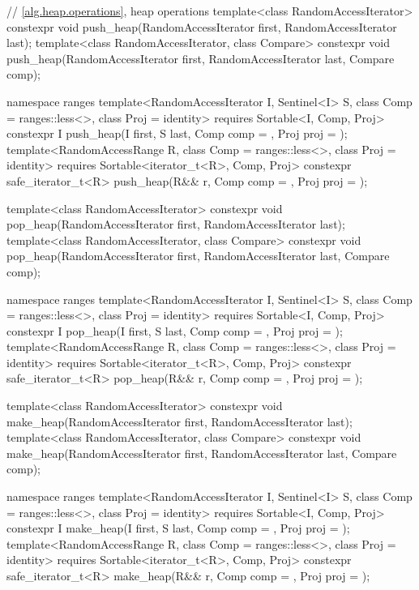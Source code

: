 \begin{codeblock}
{  // \ref{alg.heap.operations}, heap operations
  template<class RandomAccessIterator>
    constexpr void push_heap(RandomAccessIterator first, RandomAccessIterator last);
  template<class RandomAccessIterator, class Compare>
    constexpr void push_heap(RandomAccessIterator first, RandomAccessIterator last,
                             Compare comp);

  namespace ranges {
    template<RandomAccessIterator I, Sentinel<I> S, class Comp = ranges::less<>,
        class Proj = identity>
      requires Sortable<I, Comp, Proj>
      constexpr I
        push_heap(I first, S last, Comp comp = {}, Proj proj = {});
    template<RandomAccessRange R, class Comp = ranges::less<>, class Proj = identity>
      requires Sortable<iterator_t<R>, Comp, Proj>
      constexpr safe_iterator_t<R>
        push_heap(R&& r, Comp comp = {}, Proj proj = {});
  }

  template<class RandomAccessIterator>
    constexpr void pop_heap(RandomAccessIterator first, RandomAccessIterator last);
  template<class RandomAccessIterator, class Compare>
    constexpr void pop_heap(RandomAccessIterator first, RandomAccessIterator last,
                            Compare comp);

  namespace ranges {
    template<RandomAccessIterator I, Sentinel<I> S, class Comp = ranges::less<>,
        class Proj = identity>
      requires Sortable<I, Comp, Proj>
      constexpr I
        pop_heap(I first, S last, Comp comp = {}, Proj proj = {});
    template<RandomAccessRange R, class Comp = ranges::less<>, class Proj = identity>
      requires Sortable<iterator_t<R>, Comp, Proj>
      constexpr safe_iterator_t<R>
        pop_heap(R&& r, Comp comp = {}, Proj proj = {});
  }

  template<class RandomAccessIterator>
    constexpr void make_heap(RandomAccessIterator first, RandomAccessIterator last);
  template<class RandomAccessIterator, class Compare>
    constexpr void make_heap(RandomAccessIterator first, RandomAccessIterator last,
                             Compare comp);

  namespace ranges {
    template<RandomAccessIterator I, Sentinel<I> S, class Comp = ranges::less<>,
        class Proj = identity>
      requires Sortable<I, Comp, Proj>
      constexpr I
        make_heap(I first, S last, Comp comp = {}, Proj proj = {});
    template<RandomAccessRange R, class Comp = ranges::less<>, class Proj = identity>
      requires Sortable<iterator_t<R>, Comp, Proj>
      constexpr safe_iterator_t<R>
        make_heap(R&& r, Comp comp = {}, Proj proj = {});
  }

}
\end{codeblock}
